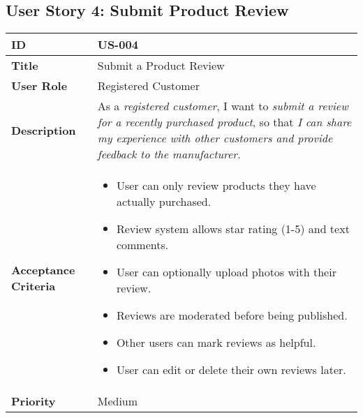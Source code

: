 \documentclass[a4paper,11pt]{article}
\begin{document}
\subsection{User Story 4: Submit Product Review}
\begin{tabularx}{\textwidth}{|l|X|}
\hline
\textbf{ID} & US-004 \\
\hline
\textbf{Title} & Submit a Product Review \\
\hline
\textbf{User Role} & Registered Customer \\
\hline
\textbf{Description} & As a \textit{registered customer}, I want to \textit{submit a review for a recently purchased product}, so that \textit{I can share my experience with other customers and provide feedback to the manufacturer}. \\
\hline
\textbf{Acceptance Criteria} &
\begin{itemize}[noitemsep, topsep=0pt]
    \item User can only review products they have actually purchased.
    \item Review system allows star rating (1-5) and text comments.
    \item User can optionally upload photos with their review.
    \item Reviews are moderated before being published.
    \item Other users can mark reviews as helpful.
    \item User can edit or delete their own reviews later.
\end{itemize} \\
\hline
\textbf{Priority} & Medium \\
\hline
\end{tabularx}
\end{document}
